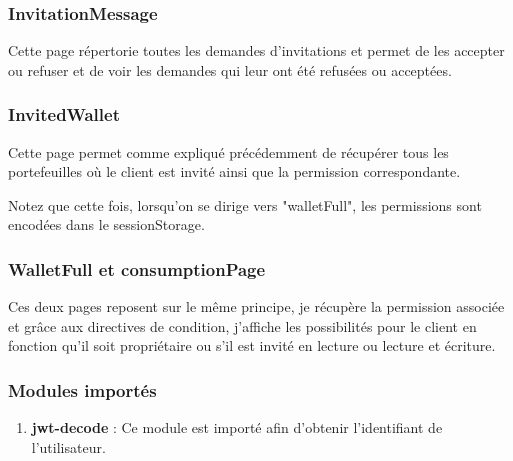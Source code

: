 \subsubsection{InvitationMessage}

\begin{flushleft}
Cette page répertorie toutes les demandes d'invitations et permet de les accepter ou refuser et de voir les demandes qui leur ont été refusées ou acceptées.
\end{flushleft}

\subsubsection{InvitedWallet}

\begin{flushleft}
Cette page permet comme expliqué précédemment de récupérer tous les portefeuilles où le client est invité ainsi que la permission correspondante.
\end{flushleft}
\begin{flushleft}
Notez que cette fois, lorsqu'on se dirige vers "walletFull", les permissions sont encodées dans le sessionStorage.
\end{flushleft}

\subsubsection{WalletFull et consumptionPage}

\begin{flushleft}
Ces deux pages reposent sur le même principe, je récupère la permission associée et grâce aux directives de condition, j'affiche les possibilités pour le client en fonction qu'il soit propriétaire ou s'il est invité en lecture ou lecture et écriture.
\end{flushleft}

\subsubsection{Modules importés}
\begin{enumerate}[-]
\item \textbf{jwt-decode} :\newline
Ce module est importé afin d'obtenir l'identifiant de l'utilisateur.
\end{enumerate}